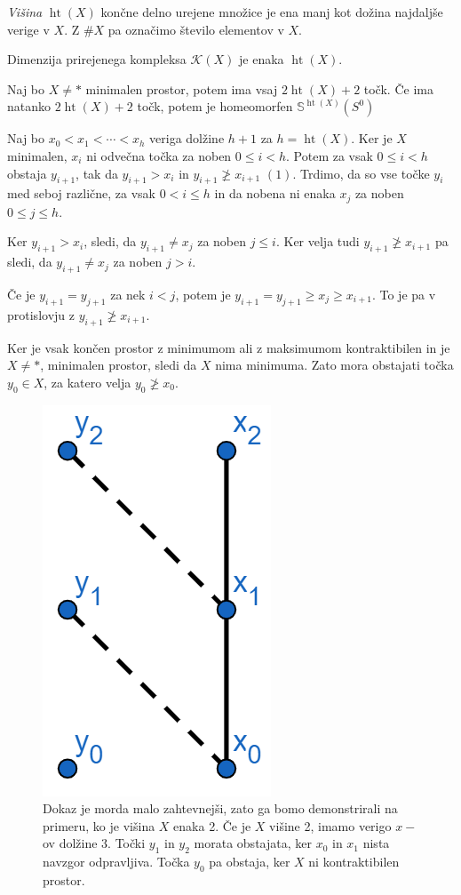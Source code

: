 \documentclass[mat1]{fmfdelo}
\DeclareMathOperator*{\htt}{ht}
\newcommand{\Sus}{\mathbb S}
\begin{document}
  \begin{definicija}
      \textit{Višina} $\htt(X)$ končne delno urejene množice je ena manj kot dožina najdaljše verige v $X$. Z $\# X$ pa označimo število elementov v $X$.
  \end{definicija}
  Dimenzija prirejenega kompleksa $\mathcal{K}(X)$ je enaka $\htt(X)$.
  
  
  \begin{izrek}
      Naj bo $X\neq\ast$ minimalen prostor, potem ima vsaj $2\htt(X)+2$ točk. Če ima natanko $2\htt(X)+2$ točk, potem je homeomorfen $\Sus^{\htt(X)}(S^0)$
  \end{izrek}    
  
  \begin{dokaz}
      Naj bo $x_0<x_1 <\cdots <x_h$ veriga dolžine $h+1$ za $h=\htt(X)$. Ker je $X$
       minimalen, $x_i$ ni odvečna točka za noben $0\leq i <h$. Potem za 
       vsak $0\leq i <h$ obstaja $y_{i+1}$, tak da $y_{i+1}> x_i$ in $y_{i+1}
       \ngeq x_{i+1}$ $(1)$. Trdimo, da so vse točke $y_i$ med seboj različne, za vsak
        $0< i \leq h$ in da nobena ni enaka $x_j$ za noben $0\leq j \leq h$.
  


        Ker $y_{i+1} > x_i$, sledi, da $y_{i+1}\neq x_j$ za noben $j\leq i$. Ker velja tudi $y_{i+1}\ngeq x_{i+1}$ pa sledi, da $y_{i+1}\neq x_j$ za 
        noben $j> i$.
  
        Če je $y_{i+1}= y_{j+1}$ za nek $i<j$, potem je $y_{i+1}= y_{j+1}\geq
         x_j \geq x_{i+1}$. To je pa v protislovju z $y_{i+1} 
         \ngeq x_{i+1}$.
  
         Ker je vsak končen prostor z minimumom ali z maksimumom kontraktibilen 
         in je $X\neq \ast$, minimalen prostor, sledi da $X$ nima minimuma. Zato mora obstajati točka $y_0\in X$, za katero velja $y_0 \ngeq x_0$.

         \begin{figure}[h!]
            \centering
            \includegraphics[width=0.2\linewidth]{minsfera-prva.png}
          \caption{Dokaz je morda malo zahtevnejši, zato ga bomo demonstrirali na primeru, ko je višina $X$ enaka 2. Če je $X$ višine 2, imamo verigo $x-$ov dolžine 3. Točki $y_1$ in $y_2$ morata obstajata, ker $x_0$ in $x_1$ nista navzgor odpravljiva. Točka $y_0$ pa obstaja, ker $X$ ni kontraktibilen prostor.}
          \end{figure}



\end{dokaz}
\end{document}
